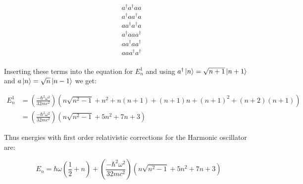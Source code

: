 \begin{equation}
    \begin{split}
        & a^\dagger a^\dagger a a\\
        &a^\dagger a a^\dagger a\\
        &a a^\dagger a^\dagger a\\
        &a^\dagger a a a^\dagger \\
        & a a^\dagger a a^\dagger \\
        & a a a^\dagger a^\dagger \\
    \end{split}
\end{equation}

Inserting these terms into the equation for $E^1_n$ and using $a^\dagger \ket{n} = \sqrt{n+1} \ket{n+1}$ and $a \ket{n} = \sqrt{n} \ket{n-1}$ we get:

\begin{equation}
\begin{split}
    E^1_n &=  \left( \frac{-\hbar^2 \omega^2}{32 m c^2} \right) \left( n\sqrt{n^2 - 1} + n^2 + n(n+1) + (n+1)n + (n+1)^2 + (n+2)(n+1) \right) \\
    &=  \left( \frac{-\hbar^2 \omega^2}{32 m c^2} \right) \left( n\sqrt{n^2 - 1} + 5n^2 + 7n + 3 \right) 
\end{split}
\end{equation}

Thus energies with first order relativistic corrections for the Harmonic oscillator are:

\begin{equation}
    E_n = \hbar \omega \left( \frac{1}{2} + n\right) + \left( \frac{-\hbar^2 \omega^2}{32 m c^2} \right) \left( n\sqrt{n^2 - 1} + 5n^2 + 7n + 3 \right) 
\end{equation}

